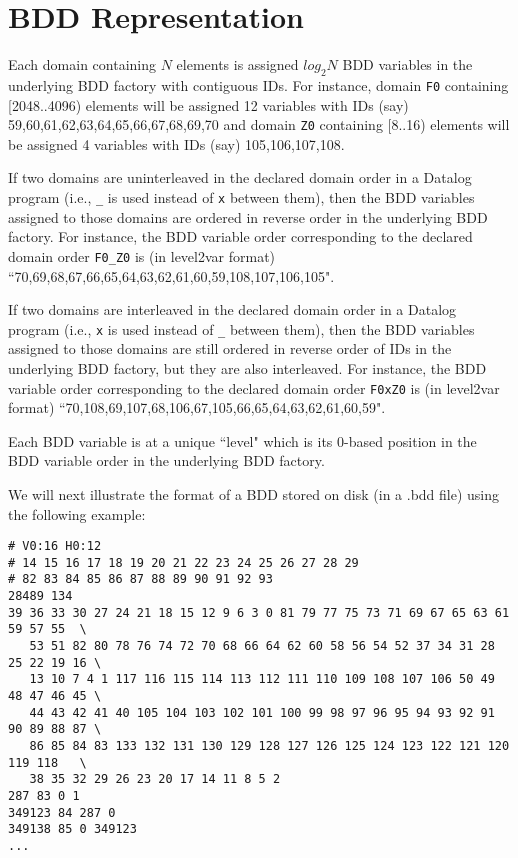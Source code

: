 \section{BDD Representation}
\label{sec:bdd-representation}

Each domain containing $N$ elements is assigned $log_2 N$ BDD variables in the underlying BDD factory with contiguous IDs.
For instance,
domain {\tt F0} containing [2048..4096) elements will be assigned 12 variables with IDs (say) 59,60,61,62,63,64,65,66,67,68,69,70 and
domain {\tt Z0} containing [8..16) elements will be assigned 4 variables with IDs (say) 105,106,107,108.

If two domains are uninterleaved in the declared domain order in a Datalog program (i.e., {\tt \_} is used instead of {\tt x} between them),
then the BDD variables assigned to those domains are ordered in reverse order in the underlying BDD factory.
For instance, the BDD variable order corresponding to the declared domain order {\tt F0\_Z0} is (in level2var format)
``70,69,68,67,66,65,64,63,62,61,60,59,108,107,106,105".

If two domains are interleaved in the declared domain order in a Datalog program (i.e., {\tt x} is used instead of {\tt \_} between them),
then the BDD variables assigned to those domains are still ordered in reverse order of IDs in the underlying BDD factory,
but they are also interleaved.
For instance, the BDD variable order corresponding to the declared domain order {\tt F0xZ0} is (in level2var format)
``70,108,69,107,68,106,67,105,66,65,64,63,62,61,60,59".

Each BDD variable is at a unique ``level" which is its 0-based position in the BDD variable order in the underlying BDD factory.

We will next illustrate the format of a BDD stored on disk (in a .bdd file) using the following example:

\begin{verbatim}
# V0:16 H0:12
# 14 15 16 17 18 19 20 21 22 23 24 25 26 27 28 29
# 82 83 84 85 86 87 88 89 90 91 92 93
28489 134
39 36 33 30 27 24 21 18 15 12 9 6 3 0 81 79 77 75 73 71 69 67 65 63 61 59 57 55  \
   53 51 82 80 78 76 74 72 70 68 66 64 62 60 58 56 54 52 37 34 31 28 25 22 19 16 \
   13 10 7 4 1 117 116 115 114 113 112 111 110 109 108 107 106 50 49 48 47 46 45 \
   44 43 42 41 40 105 104 103 102 101 100 99 98 97 96 95 94 93 92 91 90 89 88 87 \
   86 85 84 83 133 132 131 130 129 128 127 126 125 124 123 122 121 120 119 118   \
   38 35 32 29 26 23 20 17 14 11 8 5 2
287 83 0 1
349123 84 287 0
349138 85 0 349123
...
\end{verbatim}

